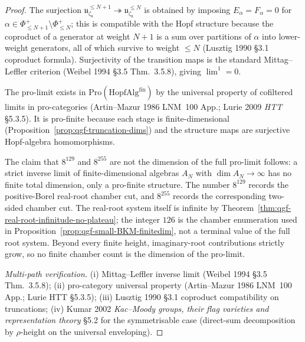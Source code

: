 \begin{proof}
The surjection $\mathfrak u_{\zeta_8}^{\leq N+1}\twoheadrightarrow
\mathfrak u_{\zeta_8}^{\leq N}$ is obtained by imposing
$E_\alpha = F_\alpha = 0$ for $\alpha\in\Phi^+_{\leq N+1}\setminus
\Phi^+_{\leq N}$; this is compatible with the Hopf structure because
the coproduct of a generator at weight $N+1$ is a sum over
partitions of $\alpha$ into lower-weight generators, all of which
survive to weight $\leq N$ (Lusztig 1990 \S3.1 coproduct formula).
Surjectivity of the transition maps is the standard Mittag--Leffler
criterion (Weibel 1994 \S3.5 Thm.~3.5.8), giving $\lim^1 = 0$.

The pro-limit exists in $\mathrm{Pro}(\mathrm{HopfAlg}^{\mathrm{fin}})$
by the universal property of cofiltered limits in pro-categories
(Artin--Mazur 1986 LNM~100 App.; Lurie 2009 \emph{HTT} \S5.3.5). It is
pro-finite because each stage is finite-dimensional
(Proposition~\ref{prop:qgf-truncation-dims}) and the structure
maps are surjective Hopf-algebra homomorphisms.

The claim that \(8^{129}\) and \(8^{255}\) are not the
dimension of the full pro-limit follows: a strict inverse limit of
finite-dimensional algebras $A_N$ with $\dim A_N\to\infty$ has no
finite total dimension, only a pro-finite structure. The number
\(8^{129}\) records the positive-Borel real-root chamber cut, and
\(8^{255}\) records the corresponding two-sided chamber cut. The
real-root system itself is infinite by
Theorem~\ref{thm:qgf-real-root-infinitude-no-plateau}; the integer
\(126\) is the chamber enumeration used in
Proposition~\ref{prop:qgf-small-BKM-finitedim}, not a terminal value of
the full root system. Beyond every finite height, imaginary-root
contributions strictly grow, so no finite chamber count is the
dimension of the pro-limit.

\emph{Multi-path verification.}
(i) Mittag--Leffler inverse limit (Weibel 1994 \S3.5 Thm.~3.5.8);
(ii) pro-category universal property
 (Artin--Mazur 1986 LNM~100 App.; Lurie HTT \S5.3.5);
(iii) Lusztig 1990 \S3.1 coproduct compatibility on truncations;
(iv) Kumar 2002 \emph{Kac--Moody groups, their flag varieties and
 representation theory} \S5.2 for the symmetrisable case
 (direct-sum decomposition by $\rho$-height on the
 universal enveloping).
\end{proof}

